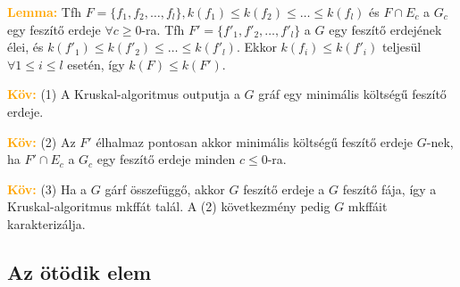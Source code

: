 \documentclass[../szamtud.tex]{subfiles}
\begin{document}
        \textcolor{orange}{\textbf{Lemma:}} Tfh $F=\{f_1,f_2,\dots,f_l\}, k(f_1) \leq k(f_2) \leq \dots \leq k(f_l)$ és $F\cap E_c$ a $G_c$ egy feszítő erdeje $\forall c \geq 0$-ra. Tfh $F' = \{f'_1, f'_2,\dots,f'_l\}$ a $G$ egy feszítő erdejének élei, és $k(f'_1) \leq k(f'_2) \leq \dots \leq k(f'_l)$. Ekkor $k(f_i) \leq k(f'_i)$ teljesül $\forall 1 \leq i \leq l$ esetén, így $k(F) \leq k(F')$.
        

        \textcolor{orange}{\textbf{Köv:}} (1) A Kruskal-algoritmus outputja a $G$ gráf egy minimális költségű feszítő erdeje. 
        

        \textcolor{orange}{\textbf{Köv:}} (2) Az $F'$ élhalmaz pontosan akkor minimális költségű feszítő erdeje $G$-nek, ha $F' \cap E_c$ a $G_c$ egy feszítő erdeje minden $c \leq 0$-ra.



        \textcolor{orange}{\textbf{Köv:}} (3) Ha a $G$ gárf összefüggő, akkor $G$ feszítő erdeje a $G$ feszítő fája, így a Kruskal-algoritmus mkffát talál. A (2) következmény pedig $G$ mkffáit karakterizálja.
    
    \subsection{Az ötödik elem}
    
\end{document}
